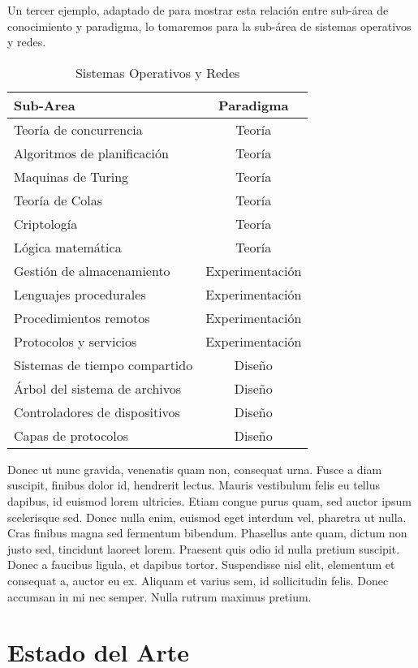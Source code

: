 Un tercer ejemplo, adaptado de \citep{EncycloCC2003} para mostrar esta relación entre sub-área de conocimiento y paradigma, lo tomaremos para la sub-área de sistemas operativos y redes.

\begin{table}[h]
\centering
\caption{Sistemas Operativos y Redes}
\begin{tabular}[t]{lc}
\hline
Sub-Area&Paradigma\\
\hline
Teoría de concurrencia& Teoría\\
Algoritmos de planificación& Teoría\\
Maquinas de Turing& Teoría\\
Teoría de Colas& Teoría\\
Criptología& Teoría\\
Lógica matemática& Teoría\\
Gestión de almacenamiento&Experimentación\\
Lenguajes procedurales&Experimentación\\
Procedimientos remotos&Experimentación\\
Protocolos y servicios&Experimentación\\
Sistemas de tiempo compartido&Diseño\\
Árbol del sistema de archivos&Diseño\\
Controladores de dispositivos&Diseño\\
Capas de protocolos&Diseño\\
\hline
\end{tabular}
\end{table}

Donec ut nunc gravida, venenatis quam non, consequat urna. Fusce a diam suscipit, finibus dolor id, hendrerit lectus. Mauris vestibulum felis eu tellus dapibus, id euismod lorem ultricies. Etiam congue purus quam, sed auctor ipsum scelerisque sed. Donec nulla enim, euismod eget interdum vel, pharetra ut nulla. Cras finibus magna sed fermentum bibendum. Phasellus ante quam, dictum non justo sed, tincidunt laoreet lorem. Praesent quis odio id nulla pretium suscipit. Donec a faucibus ligula, et dapibus tortor. Suspendisse nisl elit, elementum et consequat a, auctor eu ex. Aliquam et varius sem, id sollicitudin felis. Donec accumsan in mi nec semper. Nulla rutrum maximus pretium. 


\section {Estado del Arte}


